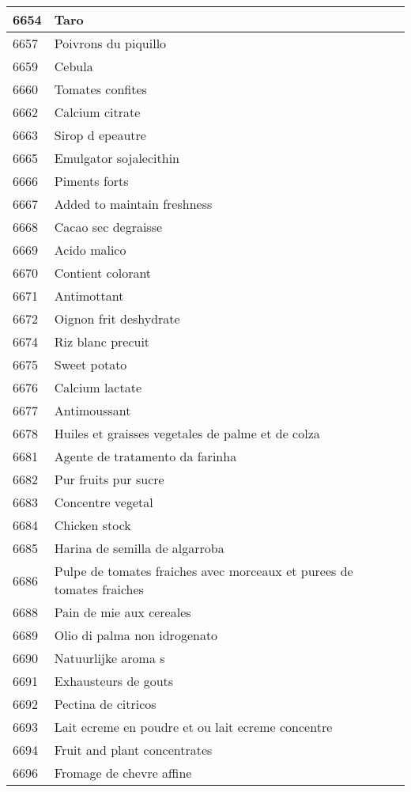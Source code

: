\begin{longtable}{|l|l|}
6654 & Taro \\ \hline 
6657 & Poivrons du piquillo \\ \hline 
6659 & Cebula \\ \hline 
6660 & Tomates confites \\ \hline 
6662 & Calcium citrate \\ \hline 
6663 & Sirop d epeautre \\ \hline 
6665 & Emulgator sojalecithin \\ \hline 
6666 & Piments forts \\ \hline 
6667 & Added to maintain freshness \\ \hline 
6668 & Cacao sec degraisse \\ \hline 
6669 & Acido malico \\ \hline 
6670 & Contient colorant \\ \hline 
6671 & Antimottant \\ \hline 
6672 & Oignon frit deshydrate \\ \hline 
6674 & Riz blanc precuit \\ \hline 
6675 & Sweet potato \\ \hline 
6676 & Calcium lactate \\ \hline 
6677 & Antimoussant \\ \hline 
6678 & Huiles et graisses vegetales de palme et de colza \\ \hline 
6681 & Agente de tratamento da farinha \\ \hline 
6682 & Pur fruits pur sucre \\ \hline 
6683 & Concentre vegetal \\ \hline 
6684 & Chicken stock \\ \hline 
6685 & Harina de semilla de algarroba \\ \hline 
6686 & Pulpe de tomates fraiches avec morceaux et purees de tomates fraiches \\ \hline 
6688 & Pain de mie aux cereales \\ \hline 
6689 & Olio di palma non idrogenato \\ \hline 
6690 & Natuurlijke aroma s \\ \hline 
6691 & Exhausteurs de gouts \\ \hline 
6692 & Pectina de citricos \\ \hline 
6693 & Lait ecreme en poudre et ou lait ecreme concentre \\ \hline 
6694 & Fruit and plant concentrates \\ \hline 
6696 & Fromage de chevre affine \\ \hline 

\end{longtable}
